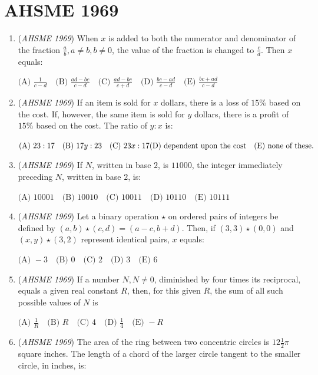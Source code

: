 \section{AHSME 1969}
        \begin{enumerate}
        	\item (\textit{AHSME 1969}) When $x$ is added to both the numerator and denominator of the fraction 
$\frac{a}{b},a \ne b,b \ne 0$, the value of the fraction is changed to $\frac{c}{d}$. 
Then $x$ equals:


 $\text{(A) } \frac{1}{c-d}\quad \text{(B) } \frac{ad-bc}{c-d}\quad \text{(C) } \frac{ad-bc}{c+d}\quad \text{(D) }\frac{bc-ad}{c-d} \quad \text{(E) } \frac{bc+ad}{c-d}$


	\item (\textit{AHSME 1969}) If an item is sold for $x$ dollars, there is a loss of $15\%$ based on the cost. If, however, the same item is sold for $y$ dollars, there is a profit of $15\%$ based on the cost. The ratio of $y:x$ is:


 $\text{(A) } 23:17\quad \text{(B) } 17y:23\quad \text{(C) } 23x:17\quad \\ \text{(D) dependent upon the cost} \quad \text{(E) none of these.}$


	\item (\textit{AHSME 1969}) If $N$, written in base $2$, is $11000$, the integer immediately preceding $N$, written in base $2$, is:


 $\text{(A) } 10001\quad \text{(B) } 10010\quad \text{(C) } 10011\quad \text{(D) } 10110\quad \text{(E) } 10111$


	\item (\textit{AHSME 1969}) Let a binary operation $\star$ on ordered pairs of integers be defined by $(a,b)\star (c,d)=(a-c,b+d)$. Then, if $(3,3)\star (0,0)$ and $(x,y)\star (3,2)$ represent identical pairs, $x$ equals:


 $\text{(A) } -3\quad \text{(B) } 0\quad \text{(C) } 2\quad \text{(D) } 3\quad \text{(E) } 6$


	\item (\textit{AHSME 1969}) If a number $N,N \ne 0$, diminished by four times its reciprocal, equals a given real constant $R$, then, for this given $R$, the sum of all such possible values of $N$ is


 $\text{(A) } \frac{1}{R}\quad \text{(B) } R\quad \text{(C) } 4\quad \text{(D) } \frac{1}{4}\quad \text{(E) } -R$


	\item (\textit{AHSME 1969}) The area of the ring between two concentric circles is $12\frac{1}{2}\pi$ square inches. The length of a chord of the larger circle tangent to the smaller circle, in inches, is:



\end{enumerate}
